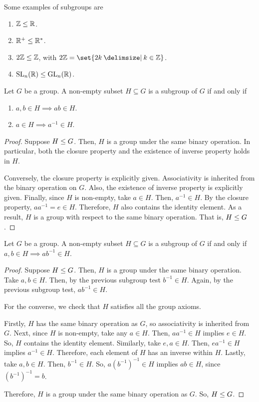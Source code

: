 \documentclass[11pt]{penrose}
\begin{document}
\begin{egg}
    Some examples of subgroups are
    \begin{enumerate}
        \item $\mathbb{Z} \mathrel{\leq} \mathbb{R}$.
        \item $\mathbb{R}^{+} \mathrel{\leq} \mathbb{R}^{*}$.
        \item $2\mathbb{Z} \mathrel{\leq} \mathbb{Z}$, with $2\Z = \set{2k \st k \in \Z}$.
        \item $\mathrm{SL}_{n}(\mathbb{R}) \mathrel{\leq} \mathrm{GL}_{n}(\mathbb{R})$.
    \end{enumerate}
\end{egg}

\begin{nthm}
    Let $G$ be a group. A non-empty subset $H \subseteq G$ is a subgroup of $G$ if and only if
    \begin{enumerate}
        \item $a, b \in H \implies ab \in H$.
        \item $a \in H \implies a^{-1} \in H$.
    \end{enumerate}
\end{nthm}
\begin{proof}
    Suppose $H \mathrel{\leq} G$. Then, $H$ is a group under the same binary operation. In particular, both the closure property and the existence of inverse property holds in $H$.

    Conversely, the closure property is explicitly given. Associativity is inherited from the binary operation on $G$. Also, the existence of inverse property is explicitly given. Finally, since $H$ is non-empty, take $a \in H$. Then, $a^{-1} \in H$. By the closure property, $a a^{-1} = e \in H$. Therefore, $H$ also contains the identity element. As a result, $H$ is a group with respect to the same binary operation. That is, $H \mathrel{\leq} G$.
\end{proof}

\begin{nthm}
    Let $G$ be a group. A non-empty subset $H \subseteq G$ is a subgroup of $G$ if and only if $a, b \in H \implies ab^{-1} \in H$.
\end{nthm}
\begin{proof}
    Suppose $H \mathrel{\leq} G$. Then, $H$ is a group under the same binary operation. Take $a, b \in H$. Then, by the previous subgroup test $b^{-1} \in H$. Again, by the previous subgroup test, $a b^{-1} \in H$.

    For the converse, we check that $H$ satisfies all the group axioms.

    Firstly, $H$ has the same binary operation as $G$, so associativity is inherited from $G$. Next, since $H$ is non-empty, take any $a \in H$. Then, $a a^{-1} \in H$ implies $e \in H$. So, $H$ contains the identity element. Similarly, take $e, a \in H$. Then, $e a^{-1} \in H$ implies $a^{-1} \in H$. Therefore, each element of $H$ has an inverse within $H$. Lastly, take $a, b \in H$. Then, $b^{-1} \in H$. So, $a \left(b^{-1}\right)^{-1} \in H$ implies $ab \in H$, since $\left(b^{-1}\right)^{-1} = b$.

    Therefore, $H$ is a group under the same binary operation as $G$. So, $H \mathrel{\leq} G$.
\end{proof}
\end{document}
